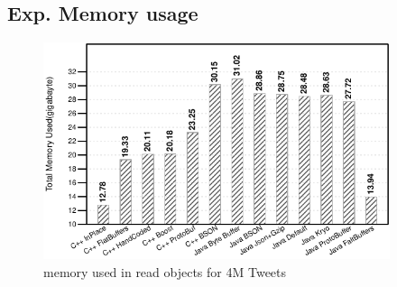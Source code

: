 \subsection{Exp. Memory usage}

\begin{figure}
	\centering
	\includegraphics[width=\columnwidth,height=2.5in,keepaspectratio]{../../RScripts/Experiment_ReadObjects_Memory.pdf}
	\caption{memory used in read objects for 4M Tweets}
	\label{fig:exp_memory}
\end{figure}